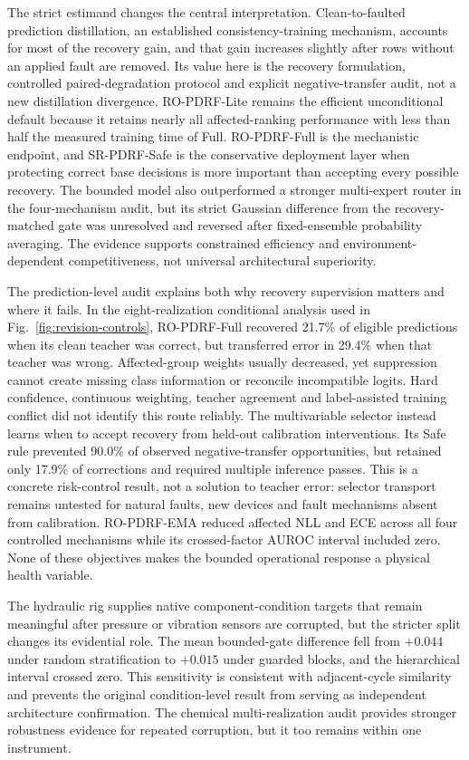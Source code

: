 \documentclass[11pt]{article}
\begin{document}
The strict estimand changes the central interpretation. Clean-to-faulted prediction distillation, an established consistency-training mechanism, accounts for most of the recovery gain, and that gain increases slightly after rows without an applied fault are removed. Its value here is the recovery formulation, controlled paired-degradation protocol and explicit negative-transfer audit, not a new distillation divergence. RO-PDRF-Lite remains the efficient unconditional default because it retains nearly all affected-ranking performance with less than half the measured training time of Full. RO-PDRF-Full is the mechanistic endpoint, and SR-PDRF-Safe is the conservative deployment layer when protecting correct base decisions is more important than accepting every possible recovery. The bounded model also outperformed a stronger multi-expert router in the four-mechanism audit, but its strict Gaussian difference from the recovery-matched gate was unresolved and reversed after fixed-ensemble probability averaging. The evidence supports constrained efficiency and environment-dependent competitiveness, not universal architectural superiority.

The prediction-level audit explains both why recovery supervision matters and where it fails. In the eight-realization conditional analysis used in Fig.~\ref{fig:revision-controls}, RO-PDRF-Full recovered 21.7\% of eligible predictions when its clean teacher was correct, but transferred error in 29.4\% when that teacher was wrong. Affected-group weights usually decreased, yet suppression cannot create missing class information or reconcile incompatible logits. Hard confidence, continuous weighting, teacher agreement and label-assisted training conflict did not identify this route reliably. The multivariable selector instead learns when to accept recovery from held-out calibration interventions. Its Safe rule prevented 90.0\% of observed negative-transfer opportunities, but retained only 17.9\% of corrections and required multiple inference passes. This is a concrete risk-control result, not a solution to teacher error: selector transport remains untested for natural faults, new devices and fault mechanisms absent from calibration. RO-PDRF-EMA reduced affected NLL and ECE across all four controlled mechanisms while its crossed-factor AUROC interval included zero. None of these objectives makes the bounded operational response a physical health variable.

The hydraulic rig supplies native component-condition targets that remain meaningful after pressure or vibration sensors are corrupted, but the stricter split changes its evidential role. The mean bounded-gate difference fell from $+0.044$ under random stratification to $+0.015$ under guarded blocks, and the hierarchical interval crossed zero. This sensitivity is consistent with adjacent-cycle similarity and prevents the original condition-level result from serving as independent architecture confirmation. The chemical multi-realization audit provides stronger robustness evidence for repeated corruption, but it too remains within one instrument.
\end{document}

